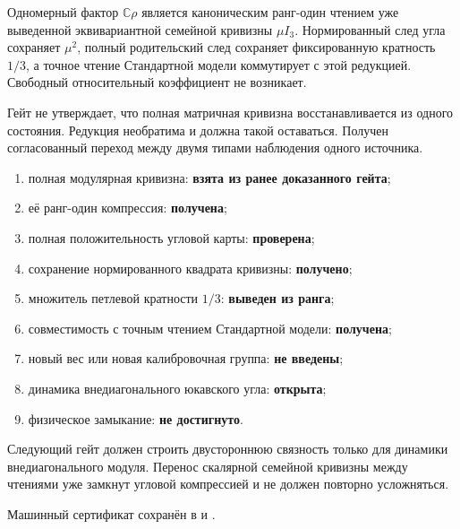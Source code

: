 \begin{theorem}
Одномерный фактор \(\mathbb C\rho\) является каноническим ранг-один чтением
уже выведенной эквивариантной семейной кривизны \(\mu I_3\). Нормированный
след угла сохраняет \(\mu^2\), полный родительский след сохраняет
фиксированную кратность \(1/3\), а точное чтение Стандартной модели
коммутирует с этой редукцией. Свободный относительный коэффициент не
возникает.
\end{theorem}

\begin{remark}
Гейт не утверждает, что полная матричная кривизна восстанавливается из
одного состояния. Редукция необратима и должна такой оставаться. Получен
согласованный переход между двумя типами наблюдения одного источника.
\end{remark}

\begin{protocol}
\begin{enumerate}
 \item полная модулярная кривизна: \textbf{взята из ранее доказанного гейта};
 \item её ранг-один компрессия: \textbf{получена};
 \item полная положительность угловой карты: \textbf{проверена};
 \item сохранение нормированного квадрата кривизны: \textbf{получено};
 \item множитель петлевой кратности \(1/3\): \textbf{выведен из ранга};
 \item совместимость с точным чтением Стандартной модели:
 \textbf{получена};
 \item новый вес или новая калибровочная группа: \textbf{не введены};
 \item динамика внедиагонального юкавского угла: \textbf{открыта};
 \item физическое замыкание: \textbf{не достигнуто}.
\end{enumerate}
\end{protocol}

Следующий гейт должен строить двустороннюю связность только для динамики
внедиагонального модуля. Перенос скалярной семейной кривизны между чтениями
уже замкнут угловой компрессией и не должен повторно усложняться.

Машинный сертификат сохранён в
 и
.